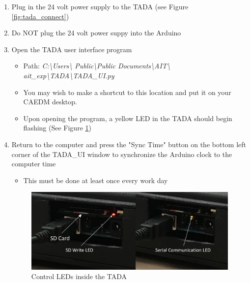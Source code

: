 \documentclass[letterpaper,11pt]{article}
\begin{document}
\begin{enumerate}
    \item Plug in the 24 volt power supply to the TADA (see Figure 
        \ref{fig:tada_connect})
		
	\item Do NOT plug the 24 volt power suppy into the Arduino
    

    \item Open the TADA user interface program 
            \begin{itemize}
            \item Path: \textit{C:\textbackslash Users\textbackslash  
                Public\textbackslash Public Documents\textbackslash AIT\textbackslash 
                ait\_exp\textbackslash TADA\textbackslash TADA\_UI.py}
            \item You may wish to make a shortcut to this location and put it on 
                your CAEDM desktop.
            \item Upon opening the program, a yellow LED in the TADA should 
                begin flashing (See Figure \ref{fig:tada_leds}) %
            \end{itemize}

    \item Return to the computer and press the "Sync Time" button on the bottom 
        left corner of the TADA\_UI
        window to synchronize the Arduino clock to the computer time
        \begin{itemize}
        \item This must be done at least once every work day
        \end{itemize}

\begin{figure}[H]
    \centering
    \includegraphics[width=.75\textwidth]{led_red_yellow.jpg}
    \caption{Control LEDs inside the TADA}
    \label{fig:tada_leds}
\end{figure}


\end{enumerate}
\end{document}
